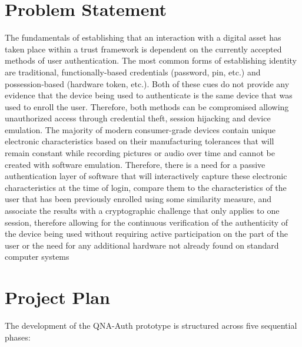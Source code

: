 
\section{Problem Statement}

The fundamentals of establishing that an interaction with a digital asset has taken place within a trust framework is dependent on the currently accepted methods of user authentication. The most common forms of establishing identity are traditional, functionally-based credentials (password, pin, etc.) and possession-based (hardware token, etc.). Both of these cues do not provide any evidence that the device being used to authenticate is the same device that was used to enroll the user. Therefore, both methods can be compromised allowing unauthorized access through credential theft, session hijacking and device emulation. The majority of modern consumer-grade devices contain unique electronic characteristics based on their manufacturing tolerances that will remain constant while recording pictures or audio over time and cannot be created with software emulation. Therefore, there is a need for a passive authentication layer of software that will interactively capture these electronic characteristics at the time of login, compare them to the characteristics of the user that has been previously enrolled using some similarity measure, and associate the results with a cryptographic challenge that only applies to one session, therefore allowing for the continuous verification of the authenticity of the device being used without requiring active participation on the part of the user or the need for any additional hardware not already found on standard computer systems


\section{Project Plan}

The development of the QNA-Auth prototype is structured across five sequential phases:

